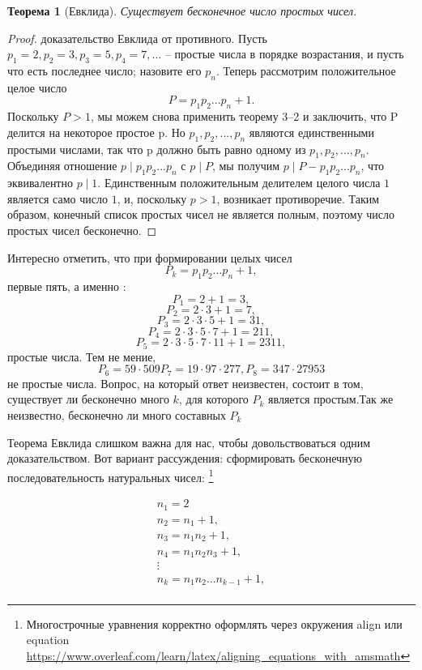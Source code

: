 \documentclass[11pt]{article}
\newtheorem{theorem}{Теорема}
\begin{document}
\begin{theorem}[Евклида]
\label{th3-4}
Существует бесконечное число простых чисел.
\end{theorem}
\begin{proof}
	доказательство Евклида от противного. Пусть ${p_{1} = 2, p_{2} = 3, p _{3} = 5, p_{4} = 7,...}$ -- простые числа в порядке возрастания, и пусть что есть последнее число; назовите его $p_{n}$. Теперь рассмотрим положительное целое число \[P = p_{1}p_{2}...p_{n} + 1.\] Поскольку $P > 1$, мы можем снова применить теорему 3--2 и заключить, что P делится на некоторое простое p. Но $p_{1},p_{2},...,p_{n}$ являются единственными простыми числами, так что p должно быть равно одному из $p_{1},p_{2},...,p_{n}$. Объединяя отношение $p\mid p_{1}p_{2}...p_{n}$ с $p\mid P$, мы получим  $p\mid P - p_{1}p_{2}...p_{n}$, что эквивалентно $p\mid 1$. Единственным положительным делителем целого числа $1$ является само число $1$, и, поскольку $p > 1$, возникает противоречие. Таким образом, конечный список простых чисел не является полным, поэтому число простых чисел бесконечно.
	\end{proof}

\thispagestyle{fancy}
\rhead{\thepage}

Интересно отметить, что при формировании целых чисел \[P_{k} = p_{1}p_{2}...p_{n} + 1,\] первые пять, а именно : \[P_{1} = 2 + 1 = 3,\] 
\[P_{2} = 2\cdot3 + 1 = 7,\] \[P_{3} = 2\cdot3\cdot5 + 1 = 31,\] \[P_{4} = 2\cdot3\cdot5\cdot7 + 1 = 211,\]\[P_{5} = 2\cdot3\cdot5\cdot7\cdot11 + 1 = 2311,\] простые числа. Тем не мение, \[P_{6} = 59\cdot509 P_{7} = 19\cdot97\cdot277, P_{8} = 347\cdot27953\] не простые числа. Вопрос, на который ответ неизвестен, состоит в том, существует ли бесконечно много $k$, для которого $P_{k}$ является простым.Так же неизвестно, бесконечно ли много составных $P_{k}$

Теорема Евклида слишком важна для нас, чтобы довольствоваться одним доказательством. Вот вариант рассуждения: сформировать бесконечную последовательность натуральных чисел:	\footnote{Многострочные уравнения корректно оформлять через окружения align или equation \url{https://www.overleaf.com/learn/latex/aligning\_equations\_with\_amsmath}}

\begin{gather*} 
n_{1} = 2\\
n_{2} = n_{1} + 1,\\
n_{3} = n_{1}n_{2} + 1,\\
n_{4} = n_{1}n_{2}n_{3} + 1,\\
\vdots\\
n_{k} = n_{1}n_{2}...n_{k-1} + 1,\\
\end{gather*}
\end{document}
